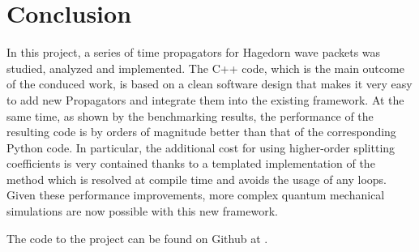 \section{Conclusion}
%
In this project, a series of time propagators for Hagedorn wave packets was studied, analyzed and implemented.
The C++ code, which is the main outcome of the conduced work, is based on a clean software design that makes it very easy to add new Propagators and integrate them into the existing framework.
At the same time, as shown by the benchmarking results, the performance of the resulting code is by orders of magnitude better than that of the corresponding Python code.
In particular, the additional cost for using higher-order splitting coefficients is very contained thanks to a templated implementation of the  method which is resolved at compile time and avoids the usage of any loops.
Given these performance improvements, more complex quantum mechanical simulations are now possible with this new framework.


\vspace{5cm}

\begin{center}
	The code to the project can be found on Github at \cite{libwaveblocks}.
\end{center}

